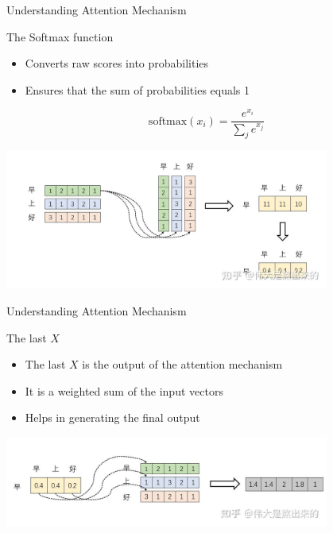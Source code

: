 \documentclass{beamer}
\begin{document}
\begin{frame}{Understanding Attention Mechanism}
    \begin{block}{The Softmax function}
        \begin{itemize}
            \item Converts raw scores into probabilities
            \item Ensures that the sum of probabilities equals 1
        \end{itemize}
    \end{block}
    \begin{equation}
        \text{softmax}(x_i) = \frac{e^{x_i}}{\sum_{j} e^{x_j}}
    \end{equation}
    \begin{center}
        \includegraphics[width=0.8\textwidth]{softmax.png}
    \end{center}
\end{frame}

\begin{frame}{Understanding Attention Mechanism}
    \begin{block}{The last $X$}
        \begin{itemize}
            \item The last $X$ is the output of the attention mechanism
            \item It is a weighted sum of the input vectors
            \item Helps in generating the final output
        \end{itemize}
        \begin{center}
            \includegraphics[width=0.8\textwidth]{output.png}
        \end{center}
    \end{block}
\end{frame}
\end{document}
